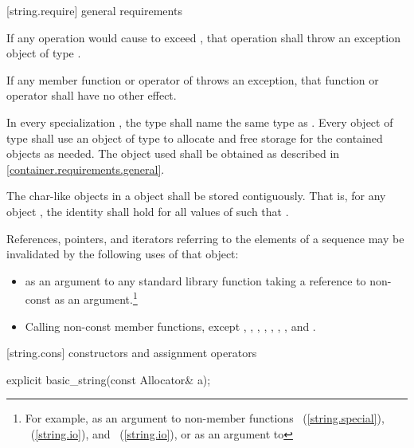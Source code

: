 [string.require]{ general requirements}

\pnum
If any operation would cause  to
exceed , that operation shall throw an
exception object of type .

\pnum
If any member function or operator of  throws an exception, that
function or operator shall have no other effect.

\pnum
In every specialization ,
the type  shall name the same type
as . Every object of type
 shall use an object of type
 to allocate and free storage for the contained 
objects as needed. The  object used shall be
obtained as described in \ref{container.requirements.general}.

\pnum
The char-like objects in a  object shall be
stored contiguously. That is, for any  object ,
the identity  shall hold for all
values of  such that .

\pnum
References, pointers, and iterators referring to the elements of a
 sequence may be
invalidated by the following uses of that  object:

\begin{itemize}
\item as an argument to any standard library function taking a reference to non-const
 as an argument.\footnote{For example, as an argument to non-member
functions ~(\ref{string.special}),
~(\ref{string.io}), and ~(\ref{string.io}), or as
an argument to }

\item Calling non-const member functions, except
,
,
,
,
,
,
,
and
.
\end{itemize}

[string.cons]{ constructors and assignment operators}

%
\begin{itemdecl}
explicit basic_string(const Allocator& a);
\end{itemdecl}

